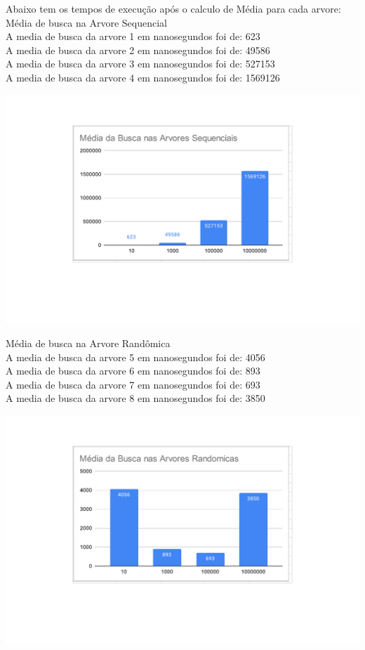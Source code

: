 Abaixo tem os tempos de execução após o calculo de Média para cada arvore:
\\Média de busca na Arvore Sequencial\\
A media de busca da arvore 1 em nanosegundos foi de: 623\\
A media de busca da arvore 2 em nanosegundos foi de: 49586\\
A media de busca da arvore 3 em nanosegundos foi de: 527153\\
A media de busca da arvore 4 em nanosegundos foi de: 1569126
    \begin{center}
            \includegraphics[scale=0.8]{Trabalho AED/fig/grafico5.pdf}
            \label{fig:Grafico 5}
    \end{center}
\pagebreak    
Média de busca na Arvore Randômica\\
A media de busca da arvore 5 em nanosegundos foi de: 4056\\
A media de busca da arvore 6 em nanosegundos foi de: 893\\
A media de busca da arvore 7 em nanosegundos foi de: 693\\
A media de busca da arvore 8 em nanosegundos foi de: 3850
    \begin{center}
            \includegraphics[scale=0.8]{Trabalho AED/fig/grafico6.pdf}
            \label{fig:Grafico 6}
    \end{center}
